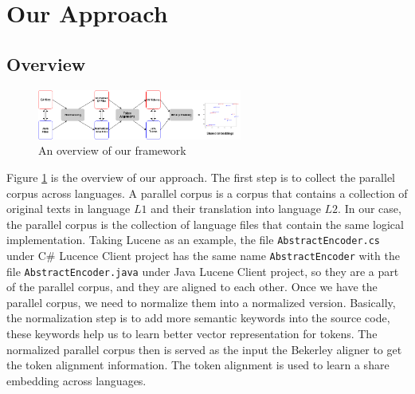 \section{Our Approach}
\subsection{Overview}

\begin{figure}[t!]
	\includegraphics[width=0.60\textwidth]{approach}
	\caption{An overview of our framework}
	\label{fig:approach}
\end{figure}


Figure \ref{fig:approach} is the overview of our approach. The first step is to collect the parallel corpus across languages.  A parallel corpus is a corpus that contains a collection of original texts in language \begin{math}L1\end{math} and their translation into language \begin{math}L2\end{math}. In our case, the parallel corpus is the collection of language files that contain the same logical implementation. Taking Lucene as an example, the file \texttt{AbstractEncoder.cs} under C\# Lucence Client project has the same name \texttt{AbstractEncoder} with the file \texttt{AbstractEncoder.java} under Java Lucene Client project, so they are a part of the parallel corpus, and they are aligned to each other. Once we have the parallel corpus, we need to normalize them into a normalized version. Basically, the normalization step is to add more semantic keywords into the source code, these keywords help us to learn better vector representation for tokens. The normalized parallel corpus then is served as the input the Bekerley aligner \cite{liang2006alignment} to get the token alignment information. The token alignment is used to learn a share embedding across languages.

